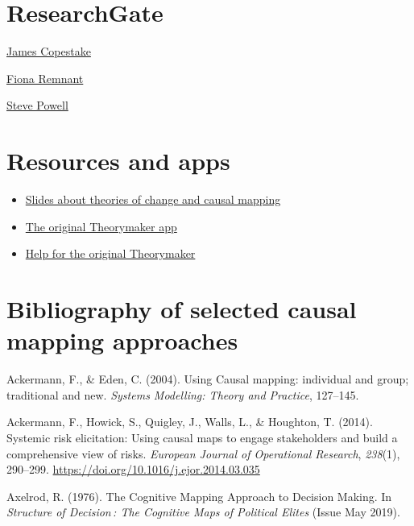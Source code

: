 \documentclass[
]{book}
\providecommand{\tightlist}{%
  \setlength{\itemsep}{0pt}\setlength{\parskip}{0pt}}
\begin{document}
\hypertarget{researchgate}{%
\section{ResearchGate}\label{researchgate}}

\href{https://www.researchgate.net/profile/James_Copestake}{James Copestake}

\href{https://www.researchgate.net/profile/Fiona_Remnant}{Fiona Remnant}

\href{https://www.researchgate.net/profile/Steve_Powell2}{Steve Powell}

\hypertarget{resources-and-apps}{%
\section{Resources and apps}\label{resources-and-apps}}

\begin{itemize}
\tightlist
\item
  \href{http://slides.theorymaker.info/}{Slides about theories of change and causal mapping}
\item
  \href{http://www.pogol.net/_causal_mapping/theorymaker.info}{The original Theorymaker app}
\item
  \href{http://help.theorymaker.info/}{Help for the original Theorymaker}
\end{itemize}

\hypertarget{bibliography-of-selected-causal-mapping-approaches}{%
\section{Bibliography of selected causal mapping approaches}\label{bibliography-of-selected-causal-mapping-approaches}}

Ackermann, F., \& Eden, C. (2004). Using Causal mapping: individual and group; traditional and new. \emph{Systems Modelling: Theory and Practice}, 127--145.

Ackermann, F., Howick, S., Quigley, J., Walls, L., \& Houghton, T. (2014). Systemic risk elicitation: Using causal maps to engage stakeholders and build a comprehensive view of risks. \emph{European Journal of Operational Research}, \emph{238}(1), 290--299. \url{https://doi.org/10.1016/j.ejor.2014.03.035}

Axelrod, R. (1976). The Cognitive Mapping Approach to Decision Making. In \emph{Structure of Decision\,: The Cognitive Maps of Political Elites} (Issue May 2019).
\end{document}
